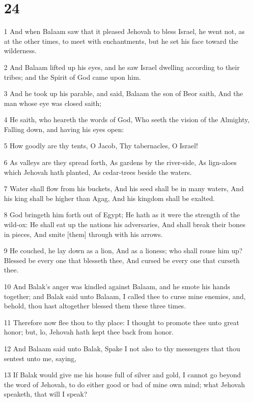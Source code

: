 \chapter{24}

\par 1 And when Balaam saw that it pleased Jehovah to bless Israel, he went not, as at the other times, to meet with enchantments, but he set his face toward the wilderness.
\par 2 And Balaam lifted up his eyes, and he saw Israel dwelling according to their tribes; and the Spirit of God came upon him.
\par 3 And he took up his parable, and said, Balaam the son of Beor saith, And the man whose eye was closed saith;
\par 4 He saith, who heareth the words of God, Who seeth the vision of the Almighty, Falling down, and having his eyes open:
\par 5 How goodly are thy tents, O Jacob, Thy tabernacles, O Israel!
\par 6 As valleys are they spread forth, As gardens by the river-side, As lign-aloes which Jehovah hath planted, As cedar-trees beside the waters.
\par 7 Water shall flow from his buckets, And his seed shall be in many waters, And his king shall be higher than Agag, And his kingdom shall be exalted.
\par 8 God bringeth him forth out of Egypt; He hath as it were the strength of the wild-ox: He shall eat up the nations his adversaries, And shall break their bones in pieces, And smite [them] through with his arrows.
\par 9 He couched, he lay down as a lion, And as a lioness; who shall rouse him up? Blessed be every one that blesseth thee, And cursed be every one that curseth thee.
\par 10 And Balak's anger was kindled against Balaam, and he smote his hands together; and Balak said unto Balaam, I called thee to curse mine enemies, and, behold, thou hast altogether blessed them these three times.
\par 11 Therefore now flee thou to thy place: I thought to promote thee unto great honor; but, lo, Jehovah hath kept thee back from honor.
\par 12 And Balaam said unto Balak, Spake I not also to thy messengers that thou sentest unto me, saying,
\par 13 If Balak would give me his house full of silver and gold, I cannot go beyond the word of Jehovah, to do either good or bad of mine own mind; what Jehovah speaketh, that will I speak?
